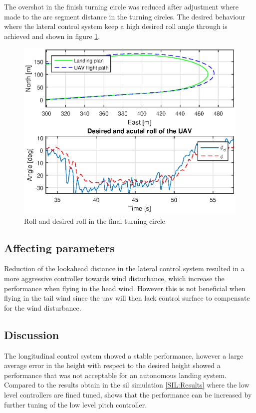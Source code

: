 The overshot in the finish turning circle was reduced after adjustment where made to the arc segment distance in the turning circles. The desired behaviour where the lateral control system keep a high desired roll angle through is achieved and shown in figure \ref{Fig:RollFinalTurning083423}.
\newpage
\begin{figure}[H]
\centering
\includegraphics[scale=0.7]{figs/Experiment/Roll1juni083423.eps}
\caption{Roll and desired roll in the final turning circle}
\label{Fig:RollFinalTurning083423}
\end{figure}
\subsection{Affecting parameters}
Reduction of the lookahead distance in the lateral control system resulted in a more aggressive controller towards wind disturbance, which increase the performance when flying in the head wind. However this is not beneficial when flying in the tail wind since the \gls{uav} will then lack control surface to compensate for the wind disturbance.
\subsection{Discussion}
The longitudinal control system showed a stable performance, however a large average error in the height with respect to the desired height showed a performance that was not acceptable for an autonomous landing system. Compared to the results obtain in the \gls{sil} simulation \ref{SIL:Results} where the low level controllers are fined tuned, shows that the performance can be increased by further tuning of the low level pitch controller.

